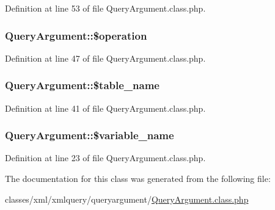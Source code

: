 Definition at line 53 of file Query\-Argument.\-class.\-php.

\hypertarget{classQueryArgument_a31f8bb196f9755a568a4fc69c4be08e3}{
\subsubsection[{\$operation}]{\setlength{\rightskip}{0pt plus 5cm}Query\-Argument\-::\$operation}}\label{classQueryArgument_a31f8bb196f9755a568a4fc69c4be08e3}


Definition at line 47 of file Query\-Argument.\-class.\-php.

\hypertarget{classQueryArgument_aba0fc1aa9d394626c35a4dd6b23452a1}{
\subsubsection[{\$table\-\_\-name}]{\setlength{\rightskip}{0pt plus 5cm}Query\-Argument\-::\$table\-\_\-name}}\label{classQueryArgument_aba0fc1aa9d394626c35a4dd6b23452a1}


Definition at line 41 of file Query\-Argument.\-class.\-php.

\hypertarget{classQueryArgument_a5f944bd99adb53d05a61aba70ff79d20}{
\subsubsection[{\$variable\-\_\-name}]{\setlength{\rightskip}{0pt plus 5cm}Query\-Argument\-::\$variable\-\_\-name}}\label{classQueryArgument_a5f944bd99adb53d05a61aba70ff79d20}


Definition at line 23 of file Query\-Argument.\-class.\-php.



The documentation for this class was generated from the following file\-:\begin{DoxyCompactItemize}
\item 
classes/xml/xmlquery/queryargument/\hyperlink{QueryArgument_8class_8php}{Query\-Argument.\-class.\-php}\end{DoxyCompactItemize}
